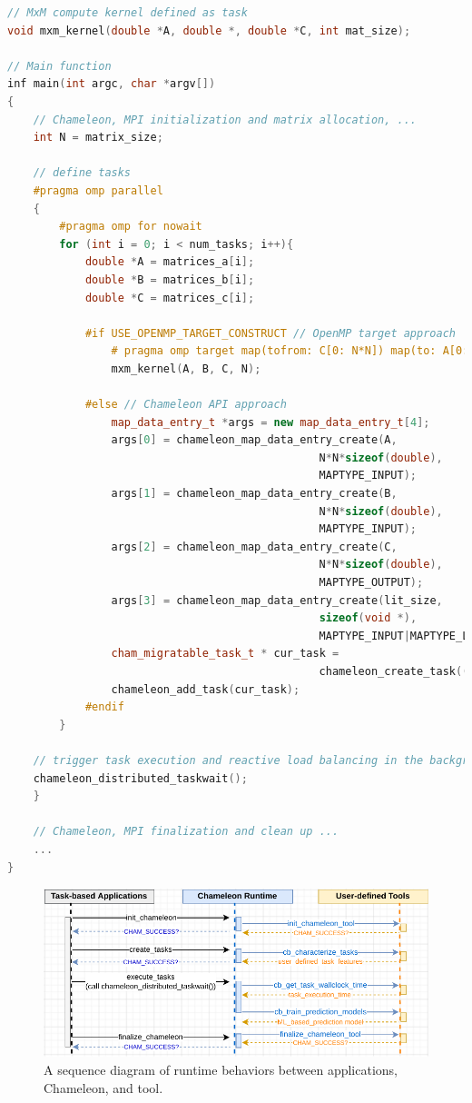 \begin{lstlisting}[language=C++, caption={A snippet code for implementing \texttt{MxM} compute tasks in Chameleon}, label={lst:cham_mxm_code}]
// MxM compute kernel defined as task
void mxm_kernel(double *A, double *, double *C, int mat_size);	
	
// Main function
inf main(int argc, char *argv[])
{
	// Chameleon, MPI initialization and matrix allocation, ...
	int N = matrix_size;

	// define tasks
	#pragma omp parallel
	{
		#pragma omp for nowait
		for (int i = 0; i < num_tasks; i++){
			double *A = matrices_a[i];
			double *B = matrices_b[i];
			double *C = matrices_c[i];
			
			#if USE_OPENMP_TARGET_CONSTRUCT // OpenMP target approach
				# pragma omp target map(tofrom: C[0: N*N]) map(to: A[0: N*N], B[0: N*N])
				mxm_kernel(A, B, C, N);

			#else // Chameleon API approach
				map_data_entry_t *args = new map_data_entry_t[4];
				args[0] = chameleon_map_data_entry_create(A,
												N*N*sizeof(double),
												MAPTYPE_INPUT);
				args[1] = chameleon_map_data_entry_create(B,
												N*N*sizeof(double),
												MAPTYPE_INPUT);
				args[2] = chameleon_map_data_entry_create(C,
												N*N*sizeof(double),
												MAPTYPE_OUTPUT);
				args[3] = chameleon_map_data_entry_create(lit_size,
												sizeof(void *),
												MAPTYPE_INPUT|MAPTYPE_LITERAL);
				cham_migratable_task_t * cur_task =
												chameleon_create_task((void *)& mxm_kernel, 4, args);
				chameleon_add_task(cur_task);
			#endif
		}
		
	// trigger task execution and reactive load balancing in the background
	chameleon_distributed_taskwait();
	}

	// Chameleon, MPI finalization and clean up ...
	...
}
\end{lstlisting}
\hfill

\begin{figure}[b]
	\centering
	\includegraphics[scale=0.7]{./pictures/poc_implementation/poc_sequence_diagram_chamtool.pdf}
	\caption{A sequence diagram of runtime behaviors between applications, Chameleon, and tool.}
	\label{fig:poc_chamtool_sequence_diagram}
\end{figure}

